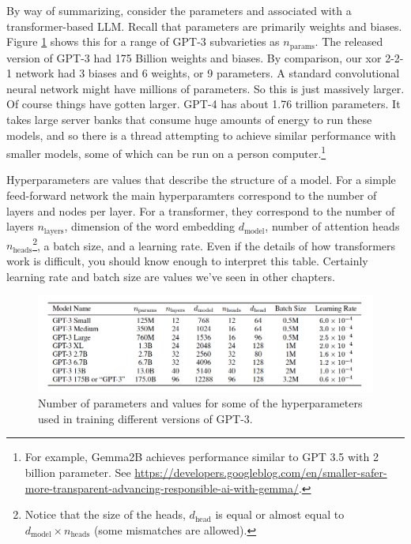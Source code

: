By way of summarizing, consider the parameters and   associated with a transformer-based LLM. Recall that parameters are primarily weights and biases. Figure \ref{gptParams} shows this for a range of GPT-3 subvarieties as $n_\text{params}$. The released version of GPT-3 had 175 Billion weights and biases. By comparison, our xor 2-2-1 network had 3 biases and 6 weights, or 9 parameters. A standard convolutional neural network might have millions of parameters. So this is just massively larger. Of course things have gotten larger. GPT-4 has about 1.76 trillion parameters. It takes large server banks that  consume huge amounts of energy to run these models, and so there is a thread attempting to achieve similar performance with smaller models, some of which can be run on a  person computer.\footnote{For example, Gemma2B achieves performance similar to GPT 3.5 with 2 billion parameter. See \url{https://developers.googleblog.com/en/smaller-safer-more-transparent-advancing-responsible-ai-with-gemma/}.}

Hyperparameters are values that describe the structure of a model. For a simple feed-forward network the main hyperparamters correspond to the number of layers and nodes per layer. For a transformer, they correspond to the number of layers $n_\text{layers}$, dimension of the word embedding $d_\text{model}$, number of attention heads $n_\text{heads}$\footnote{Notice that the size of the heads, $d_\text{head}$ is equal or almost equal to  $d_\text{model} \times n_\text{heads}$ (some mismatches are allowed).}, a batch size, and a learning rate. Even if the details of how transformers work is difficult, you should know enough to interpret this table. Certainly learning rate and batch size are values we've seen in other chapters.

\begin{figure}[h]
\centering
\includegraphics[scale=.4]{./images/gpt3_params.png}
\caption[\url{https://arxiv.org/abs/2005.14165}.]{Number of parameters and values for some of the hyperparameters used in training different versions of GPT-3. }
\label{gptParams}
\end{figure}


